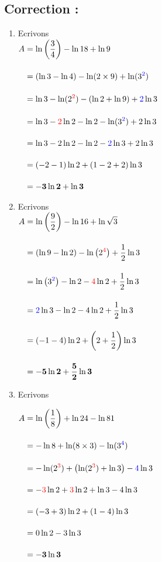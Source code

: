 \documentclass[12pt,a4paper]{article}
\begin{document}
\subsection*{\color{myred}Correction :}
\begin{enumerate}
\item Ecrivons\\ $
\begin{aligned}
A &= \ln\left(\dfrac{3}{4}\right) - \ln 18 + \ln 9\\[4mm]
  &= (\ln 3 - \ln 4) - \ln(2 \times 9) + \ln(3^{\color{blue}2})\\[4mm]
  &= \ln 3 - \ln(2^{\color{red}2}) - (\ln 2 + \ln 9) + {\color{blue}2}\ln 3\\[4mm]
  &= \ln 3 - {\color{red}2}\ln 2 - \ln 2 - \ln(3^{\color{blue}2}) + 2\ln 3\\[4mm]
  &= \ln 3 - 2\ln 2 - \ln 2 - {\color{blue}2}\ln 3 + 2\ln 3\\[4mm]
  &= (-2 - 1)\ln 2 + (1 - 2 + 2)\ln 3\\[4mm]
  &= \mathbf{-3\ln 2 + \ln 3}
\end{aligned}
$
    \item Ecrivons\\ $
\begin{aligned}
A &= \ln\left(\dfrac{9}{2}\right) - \ln 16 + \ln \sqrt{3}\\[4mm]
  &= \left(\ln 9 - \ln 2\right) - \ln\left(2^{\color{red}4}\right) + \dfrac{1}{2}\ln 3\\[4mm]
  &= \ln\left(3^{\color{blue}2}\right) - \ln 2 - {\color{red}4}\ln 2 + \dfrac{1}{2}\ln 3\\[4mm]
  &= {\color{blue}2}\ln 3 - \ln 2 - 4\ln 2 + \dfrac{1}{2}\ln 3\\[4mm]
  &= (-1 - 4)\ln 2 + \left(2 + \dfrac{1}{2}\right)\ln 3\\[4mm]
  &= \mathbf{-5\ln 2 + \dfrac{5}{2}\ln 3}
\end{aligned}
$

\item Ecrivons 

$
\begin{aligned}
A &= \ln\left(\dfrac{1}{8}\right) + \ln 24 - \ln 81\\[4mm]
  &= -\ln 8 + \ln(8 \times 3) - \ln(3^{\color{blue}4})\\[4mm]
  &= -\ln(2^{\color{red}3}) + \left(\ln(2^{\color{red}3}) + \ln 3\right) - {\color{blue}4}\ln 3\\[4mm]
  &= -{\color{red}3}\ln 2 + {\color{red}3}\ln 2 + \ln 3 - 4\ln 3\\[4mm]
  &= (-3 + 3)\ln 2 + (1 - 4)\ln 3\\[4mm]
  &= 0\ln 2 - 3\ln 3\\[4mm]
  &= \mathbf{-3\ln 3}
\end{aligned}
$
\end{enumerate}
\end{document}
